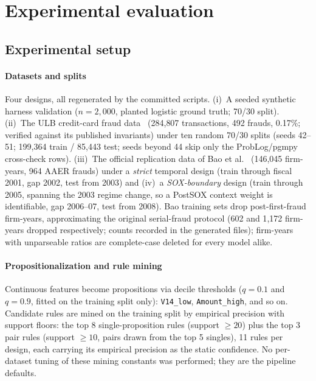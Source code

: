 \section{Experimental evaluation}\label{sec:evaluation}

\subsection{Experimental setup}\label{sec:setup}

\paragraph{Datasets and splits} Four designs, all regenerated by the
committed scripts. (i)~A seeded synthetic harness validation
($n{=}2{,}000$, planted logistic ground truth; 70/30 split).
(ii)~The ULB credit-card fraud data~\cite{dalpozzolo2015}
(284{,}807 transactions, 492 frauds, 0.17\%; verified against its
published invariants) under ten random 70/30 splits (seeds 42--51;
199{,}364 train / 85{,}443 test; seeds beyond 44 skip only the
ProbLog/pgmpy cross-check rows). (iii)~The official replication data of
Bao et al.~\cite{bao2020} (146{,}045 firm-years, 964 AAER frauds) under
a \emph{strict} temporal design (train through fiscal 2001, gap 2002,
test from 2003) and (iv)~a \emph{SOX-boundary} design (train through
2005, spanning the 2003 regime change, so a PostSOX context weight is
identifiable, gap 2006--07, test from 2008). Bao training sets drop
post-first-fraud firm-years, approximating the original serial-fraud
protocol (602 and 1{,}172 firm-years dropped respectively; counts
recorded in the generated files); firm-years with unparseable ratios are
complete-case deleted for every model alike.

\paragraph{Propositionalization and rule mining} Continuous features
become propositions via decile thresholds ($q{=}0.1$ and $q{=}0.9$,
fitted on the training split only): \texttt{V14\_low},
\texttt{Amount\_high}, and so on. Candidate rules are mined on the
training split by empirical precision with support floors: the top 8
single-proposition rules (support $\ge 20$) plus the top 3 pair rules
(support $\ge 10$, pairs drawn from the top 5 singles), 11 rules per
design, each carrying its empirical precision as the static confidence.
No per-dataset tuning of these mining constants was performed; they are
the pipeline defaults.

